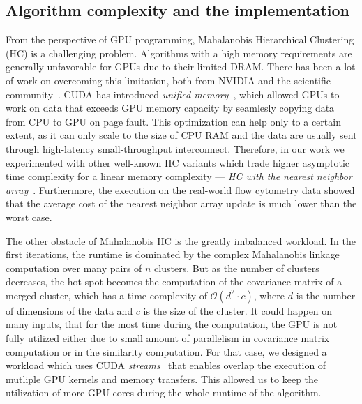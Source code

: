 




\subsection{Algorithm complexity and the implementation}

From the perspective of GPU programming, Mahalanobis Hierarchical Clustering (HC) is a challenging problem. Algorithms with a high memory requirements are generally unfavorable for GPUs due to their limited DRAM. There has been a lot of work on overcoming this limitation, both from NVIDIA and the scientific community~\cite{zheng2016towards,kim2020batch,landaverde2014investigation}. CUDA has introduced \emph{unified memory}~\cite{site:cuda}, which allowed GPUs to work on data that exceeds GPU memory capacity by seamlesly copying data from CPU to GPU on page fault. This optimization can help only to a certain extent, as it can only scale to the size of CPU RAM and the data are usually sent through high-latency small-throughput interconnect. Therefore, in our work we experimented with other well-known HC variants which trade higher asymptotic time complexity for a linear memory complexity --- \emph{HC with the nearest neighbor array}~\cite{day1984efficient}. Furthermore, the execution on the real-world flow cytometry data showed that the average cost of the nearest neighbor array update is much lower than the worst case.


The other obstacle of Mahalanobis HC is the greatly imbalanced workload. In the first iterations, the runtime is dominated by the complex Mahalanobis linkage computation over many pairs of $n$ clusters. But as the number of clusters decreases, the hot-spot becomes the computation of the covariance matrix of a merged cluster, which has a time complexity of $\mathcal{O}(d^2 \cdot c)$, where $d$ is the number of dimensions of the data and $c$ is the size of the cluster. It could happen on many inputs, that for the most time during the computation, the GPU is not fully utilized either due to small amount of parallelism in covariance matrix computation or in the similarity computation. For that case, we designed a workload which uses CUDA \emph{streams}~\cite{site:cuda} that enables overlap the execution of mutliple GPU kernels and memory transfers. This allowed us to keep the utilization of more GPU cores during the whole runtime of the algorithm.

